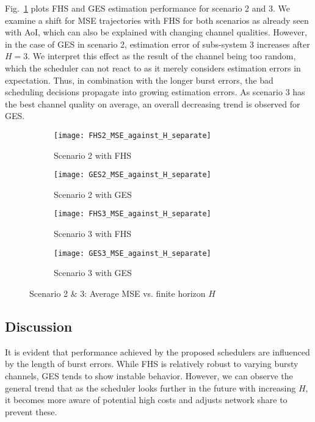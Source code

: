 Fig.~\ref{fig:MSEavg2} plots FHS and GES estimation performance for scenario 2
and 3. We examine a shift for MSE trajectories with FHS for both scenarios as
already seen with AoI, which can also be explained with changing channel
qualities. However, in the case of GES in scenario 2, estimation error of
subs-system 3 increases after $H=3$. We interpret this effect as the result of
the channel being too random, which the scheduler can not react to as it merely
considers estimation errors in expectation. Thus, in combination with the longer
burst errors, the bad scheduling decisions propagate into growing estimation
errors. As scenario 3 has the best channel quality on average, an overall
decreasing trend is observed for GES.

\begin{figure}[htb]
  \centering
  \begin{subfigure}[b]{0.49\textwidth}
    \centering
    \texttt{[image: FHS2\_MSE\_against\_H\_separate]}
    \caption{Scenario 2 with FHS}
  \end{subfigure}
  \hfill
  \begin{subfigure}[b]{0.49\textwidth}
    \centering
    \texttt{[image: GES2\_MSE\_against\_H\_separate]}
    \caption{Scenario 2 with GES}
  \end{subfigure}
  \begin{subfigure}[b]{0.49\textwidth}
    \centering
    \texttt{[image: FHS3\_MSE\_against\_H\_separate]}
    \caption{Scenario 3 with FHS}
  \end{subfigure}
  \hfill
  \begin{subfigure}[b]{0.49\textwidth}
    \centering
    \texttt{[image: GES3\_MSE\_against\_H\_separate]}
    \caption{Scenario 3 with GES}
  \end{subfigure}
  \caption{Scenario 2 \& 3: Average MSE vs. finite horizon $H$}
  \label{fig:MSEavg2}
\end{figure}

\subsection{Discussion}

It is evident that performance achieved by the proposed schedulers are
influenced by the length of burst errors. While FHS is relatively robust to
varying bursty channels, GES tends to show instable behavior. However, we can
observe the general trend that as the scheduler looks further in the future with
increasing $H$, it becomes more aware of potential high costs and adjusts
network share to prevent these.

